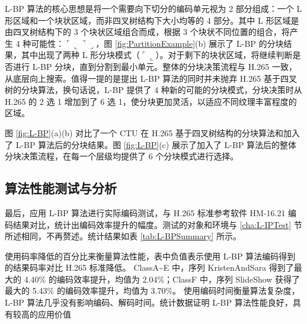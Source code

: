 L-BP 算法的核心思想是将一个需要向下切分的编码单元视为 2 部分组成：一个 L 形区域和一个块状区域，而非四叉树结构下大小均等的 4 部分。其中 L 形区域是由四叉树结构下的 3 个块状区域组合而成，根据 3 个块状不同位置的组合，将产生 4 种可能性：$\ulcorner \llcorner \urcorner \lrcorner$，图 \ref{fig:PartitionExample}(b) 展示了 L-BP 的分块结果，其中出现了两种 L 形分块模式（$\ulcorner \llcorner$）。对于剩下的块状区域，将继续判断是否进行 L-BP 分块，直到分割到最小单元。整体的分块决策流程与 H.265 一致，从底层向上搜索。值得一提的是提出 L-BP 算法的同时并未抛弃 H.265 基于四叉树的分块算法，换句话说，L-BP 提供了 4 种新的可能的分块模式，分块决策时从 H.265 的 2 选 1 增加到了 6 选 1，使分块更加灵活，以适应不同纹理丰富程度的区域。

图 \ref{fig:L-BP}(a)(b) 对比了一个 CTU 在 H.265 基于四叉树结构的分块算法和加入了 L-BP 算法后的分块结果。图 \ref{fig:L-BP}(c) 展示了加入了 L-BP 算法后的整体分块决策流程，在每一个层级均提供了 6 个分块模式进行选择。
\begin{figure}[!p]
\end{figure}

\subsection{算法性能测试与分析}
\label{cha:L-BPTest}
最后，应用 L-BP 算法进行实际编码测试，与 H.265 标准参考软件 HM-16.21 编码结果对比，统计出编码效率提升的幅度。测试的对象和环境与 \ref{cha:L-IPTest} 节所述相同，不再赘述。统计结果如表 \ref{tab:L-BPSummary} 所示。

使用码率降低的百分比来衡量算法性能，表中负值表示使用 L-BP 算法编码得到的结果码率对比 H.265 标准降低。
ClassA\textasciitilde E 中，序列 KristenAndSara 得到了最大的 4.40\% 的编码效率提升，均值为 2.04\%；ClassF 中，序列 SlideShow 获得了最大的 5.43\% 的编码效率提升，均值为 3.70\%。
使用编码时间衡量算法复杂度，L-BP 算法几乎没有影响编码、解码时间。统计数据证明 L-BP 算法性能良好，具有较高的应用价值

